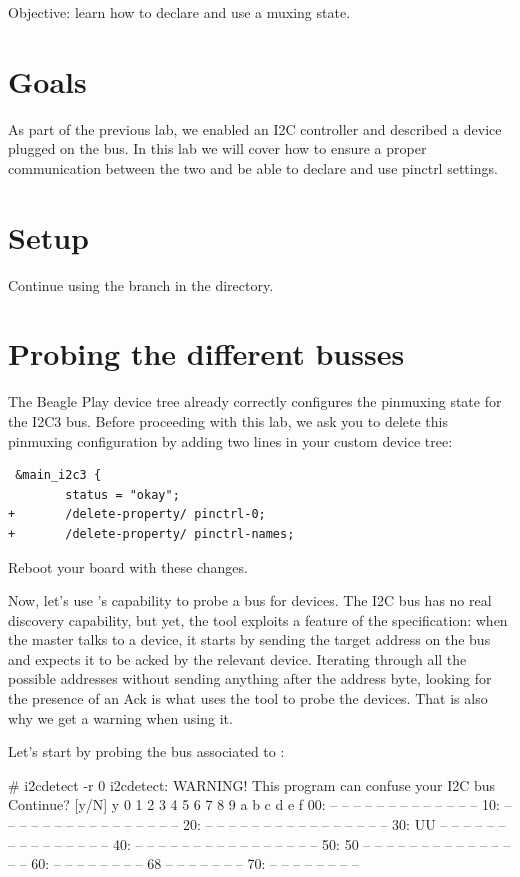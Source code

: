 {Objective: learn how to declare and use a muxing state.}

\section{Goals}

As part of the previous lab, we enabled an I2C controller and described
a device plugged on the bus. In this lab we will cover how to ensure a
proper communication between the two and be able to declare and use
pinctrl settings.

\section{Setup}

Continue using the  branch in the
 directory.

\section{Probing the different busses}

The Beagle Play device tree already correctly configures the pinmuxing state
for the I2C3 bus. Before proceeding with this lab, we ask you to delete this
pinmuxing configuration by adding two lines in your custom device tree:

\begin{verbatim}
 &main_i2c3 {
        status = "okay";
+       /delete-property/ pinctrl-0;
+       /delete-property/ pinctrl-names;
\end{verbatim}

Reboot your board with these changes.

Now, let's use 's capability to probe a bus for
devices. The I2C bus has no real discovery capability, but yet, the tool
exploits a feature of the specification: when the master talks to a
device, it starts by sending the target address on the bus and expects
it to be acked by the relevant device. Iterating through all the
possible addresses without sending anything after the address byte,
looking for the presence of an Ack is what uses the tool to probe the
devices. That is also why we get a warning when using it.

Let's start by probing the bus associated to :

\begin{bashinput}
# i2cdetect -r 0
i2cdetect: WARNING! This program can confuse your I2C bus
Continue? [y/N] y
     0  1  2  3  4  5  6  7  8  9  a  b  c  d  e  f
00:          -- -- -- -- -- -- -- -- -- -- -- -- -- 
10: -- -- -- -- -- -- -- -- -- -- -- -- -- -- -- -- 
20: -- -- -- -- -- -- -- -- -- -- -- -- -- -- -- -- 
30: UU -- -- -- -- -- -- -- -- -- -- -- -- -- -- -- 
40: -- -- -- -- -- -- -- -- -- -- -- -- -- -- -- -- 
50: 50 -- -- -- -- -- -- -- -- -- -- -- -- -- -- -- 
60: -- -- -- -- -- -- -- -- 68 -- -- -- -- -- -- -- 
70: -- -- -- -- -- -- -- -- 
\end{bashinput}

